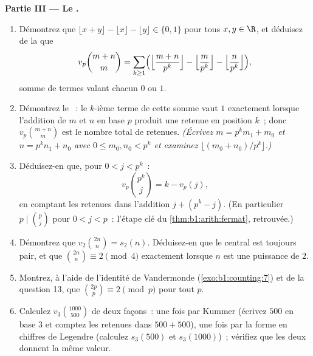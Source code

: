 \begin{problem}
\medskip
\noindent\textbf{Partie III --- Le .}
\begin{enumerate}[resume]
  \item Démontrez que $\lfloor x + y \rfloor - \lfloor x \rfloor -
        \lfloor y \rfloor \in \{0, 1\}$ pour tous $x, y \in \R$, et
        déduisez de la  que
        \[
        v_p\binom{m+n}m
        = \sum_{k\geq1}\Bigl(
        \Bigl\lfloor\frac{m+n}{p^k}\Bigr\rfloor
        - \Bigl\lfloor\frac{m}{p^k}\Bigr\rfloor
        - \Bigl\lfloor\frac{n}{p^k}\Bigr\rfloor\Bigr),
        \]
        somme de termes valant chacun $0$ ou $1$.
  \item Démontrez le \emph{}~: le $k$-ième terme de cette somme
        vaut $1$ exactement lorsque l'addition de $m$ et $n$ en
        base $p$ produit une retenue en position $k$~; donc
        $v_p\binom{m+n}m$ est le nombre total de retenues.
        \emph{(Écrivez $m = p^km_1 + m_0$ et $n = p^kn_1 + n_0$
        avec $0 \leq m_0, n_0 < p^k$ et examinez $\lfloor (m_0 +
        n_0)/p^k \rfloor$.)}
  \item Déduisez-en que, pour $0 < j < p^k$~:
        \[
        v_p\binom{p^k}{j} = k - v_p(j) ,
        \]
        en comptant les retenues dans l'addition $j + (p^k - j)$.
        (En particulier $p \mid \binom p j$ pour $0 < j < p$~: l'étape
        clé du \cref{thm:b1:arith:fermat}, retrouvée.)
  \item Démontrez que $v_2\binom{2n}n = s_2(n)$. Déduisez-en que le
         central est toujours pair, et que
        $\binom{2n}n \equiv 2 \pmod 4$ exactement lorsque $n$ est une puissance
        de $2$.
  \item Montrez, à l'aide de l'identité de Vandermonde
        (\cref{exo:b1:counting:7}) et de la question 13, que
        $\binom{2p}p \equiv 2 \pmod p$ pour tout  $p$.
  \item Calculez $v_3\binom{1000}{500}$ de deux façons~: une fois par Kummer
        (écrivez $500$ en base $3$ et comptez les retenues dans $500 +
        500$), une fois par la forme en chiffres de Legendre (calculez $s_3(500)$
        et $s_3(1000)$)~; vérifiez que les deux donnent la même valeur.
\end{enumerate}


\end{problem}
